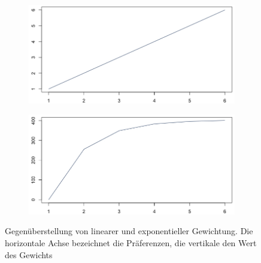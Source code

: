             \begin{figure}
                \centering
                \begin{subfigure}{0.49\textwidth}
                    \includegraphics[width=1.0\textwidth]{./algorithm/images/lin_weights.png}
                \end{subfigure}
                \begin{subfigure}{0.49\textwidth}
                    \includegraphics[width=1.0\textwidth]{./algorithm/images/expo_weights.png}
                \end{subfigure}
                \caption{Gegenüberstellung von linearer und exponentieller Gewichtung. Die horizontale Achse bezeichnet die Präferenzen, die vertikale den Wert des Gewichts}
                \label{fig:weights}
            \end{figure}
            
        
